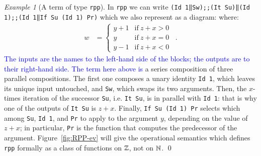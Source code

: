 \documentclass[preprint]{elsarticle}
\theoremstyle{remark}
\newtheorem{example}{Example}
\begin{document}
\begin{example}[A term of type \texttt{rpp}]
\label{example:A first legal term of type RPP}
In \lstinline|rpp| we can write \lstinline|(Id 1‖Sw);;(It Su)‖(Id 1);;(Id 1‖If Su (Id 1) Pr)| which we also represent as a diagram:
where:
$$ \begin{aligned}
    w & = \begin{cases}
        y+1 & \textrm{if}\ z+x>0 \\
        y & \textrm{if}\ z+x=0 \\
        y-1 & \textrm{if}\ z+x<0
    \end{cases}
\enspace .
\end{aligned} $$
\textcolor{blue}{The inputs are the names to the left-hand side of the blocks; the outputs are to their right-hand side.}
\textcolor{blue}{The term here above is} a series composition of three parallel compositions.
The first one composes a unary identity \lstinline|Id 1|, which leaves its unique input untouched, and \lstinline|Sw|, which swaps its two arguments. Then, the $ x $-times iteration of the successor \lstinline|Su|, i.e. \lstinline|It Su|, is in parallel with \lstinline|Id 1|: that is why one of the outputs of \lstinline|It Su| is $ z + x $. Finally, \lstinline|If Su (Id 1) Pr| selects which among \lstinline|Su|, \lstinline|Id 1|, and \lstinline|Pr| to apply to the argument $ y $, depending on the value of $ z+x $; in particular, \lstinline|Pr| is the function that computes the predecessor of the argument. Figure~\ref{fig:RPP-ev} will give the operational semantics which defines \lstinline|rpp| formally as a class of functions on $ \mathbb{Z}$, not on $ \mathbb{N} $.
\qed
\end{example}
\end{document}
